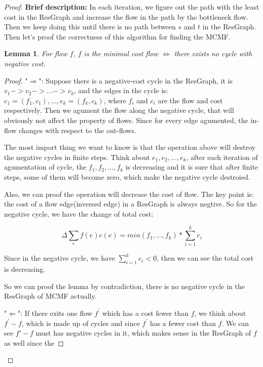 \documentclass[12pt,a4paper]{article}
\newtheorem{lemma}[theorem]{Lemma}
\theoremstyle{definition}
\begin{document}
\begin{enumerate}
\begin{proof}
	\textbf{Brief description:} In each iteration, we figure out the path with the least cost in the ResGraph and increase the flow in the path by the bottleneck flow. Then we keep doing this until there is no
	path between $s$ and $t$ in the ResGraph. Then let's proof the correctness of this algorithm for finding the MCMF.

	
	\begin{lemma}
		For flow $f$, $f$ is the minimal cost flow $\Leftrightarrow$ there exists no cycle with negative cost.
	\end{lemma}
	
	\begin{proof}
		"$\Rightarrow$":
		Suppose there is a negative-cost cycle in the ResGraph, it is $v_1 -> v_2 -> ... -> v_k$, and the edges in the cycle is: $e_1 = (f_1, c_1), ..., e_k = (f_k, c_k)$, 
		where $f_i$ and $c_i$ are the flow and cost respectively. Then we agument the flow along the negative cycle, that will obviously not affect the property of flows. Since for every edge 
		agumented, the in-flow changes with respect to the out-flows. 
		
		The most import thing we want to know is that the operation above will destroy the negative cycles in finite steps. 
		Think about $e_1, e_2, ..., e_k$, after each iteration of agumentation of cycle, the $f_1, f_2, ..., f_k$ is decreasing and it is sure that after finite steps, some of them will become 
		zero, which make the negative cycle destroied. 

		Also, we can proof the operation will decrease the cost of flow. The key point is: the cost of a flow edge(inversed edge) in a ResGraph is always negtive. So for the negative
		cycle, we have the change of total cost:

		\begin{equation*}
			\Delta{\sum_{e}{f(e)c(e)}} = min(f_1, ..., f_k) * \sum_{i=1}^{k}c_i 
		\end{equation*}

		Since in the negative cycle, we have $\sum_{i=1}^{k}c_i < 0$, then we can see the total cost is decreasing.

		So we can proof the lemma by contradiction, there is no negative cycle in the ResGraph of MCMF actually. 
	
		"$\Leftarrow$": If there exits one flow $f^{'}$ which has a cost fewer than $f$, we think about $f^{'} - f$, which is made up of cycles and since $f^{'}$ has a fewer cost than $f$. 
		We can see $f{'} - f$ must has negative cycles in it, which makes sense in the ResGraph of $f$ as well since the 
		

\end{proof}
\end{proof}
\end{enumerate}
\end{document}

